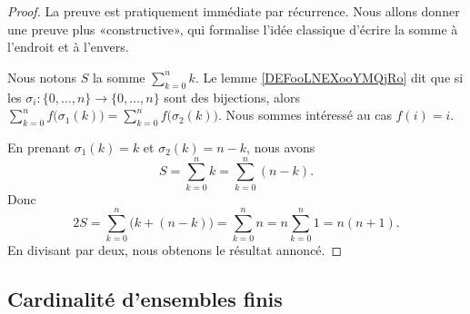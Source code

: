\begin{proof}
	La preuve est pratiquement immédiate par récurrence. Nous allons donner une preuve plus «constructive», qui formalise l'idée classique d'écrire la somme à l'endroit et à l'envers.


	Nous notons \( S\) la somme \( \sum_{k=0}^nk\). Le lemme \ref{DEFooLNEXooYMQjRo} dit que si les \( \sigma_i\colon \{ 0,\ldots, n \}\to \{ 0,\ldots, n \}\) sont des bijections, alors \( \sum_{k=0}^nf\big( \sigma_1(k) \big)=\sum_{k=0}^nf\big( \sigma_2(k) \big)\). Nous sommes intéressé au cas \( f(i)=i\).

	En prenant \( \sigma_1(k)=k\) et \( \sigma_2(k)=n-k\), nous avons
	\begin{equation}
		S=\sum_{k=0}^nk=\sum_{k=0}^n(n-k).
	\end{equation}
	Donc
	\begin{equation}
		2S=\sum_{k=0}^n\big( k+(n-k) \big)=\sum_{k=0}^nn=n\sum_{k=0}^n1=n(n+1).
	\end{equation}
	En divisant par deux, nous obtenons le résultat annoncé.
\end{proof}




\subsection{Cardinalité d'ensembles finis}

